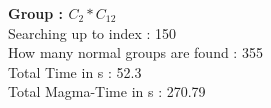 \textbf{Group : $C_2*C_{12}$}\\
Searching up to index : 150\\
How many normal groups are found : 355\\
Total Time in s : 52.3\\
Total Magma-Time in s : 270.79\\
